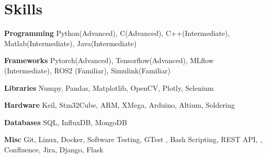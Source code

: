 
\section{Skills}
  \vspace{2pt}
  \resumeSubHeadingListStart
    \small{\item{

    \textbf{\color{MidnightBlue}Programming}{ Python(Advanced), C(Advanced), C++(Intermediate), Matlab(Intermediate), Java(Intermediate)} \\ \vspace{3pt}

    \textbf{\color{MidnightBlue}Frameworks}{ Pytorch(Advanced), Tensorflow(Advanced), MLflow (Intermediate)}, ROS2 (Familiar), Simulink(Familiar)\\ \vspace{3pt}

    \textbf{\color{MidnightBlue}Libraries}{ Numpy, Pandas, Matplotlib, OpenCV, Plotly, Selenium} \\ \vspace{3pt}

    \textbf{\color{MidnightBlue}Hardware}{ Keil, Stm32Cube, ARM, XMega, Arduino, Altium, Soldering} \\ \vspace{3pt}

    \textbf{\color{MidnightBlue}Databases}{ SQL, InfluxDB, MongoDB} \\ \vspace{3pt}

    \textbf{\color{MidnightBlue}Misc}{ Git, Linux, Docker, Software Testing, GTest , Bash Scripting, REST API, , Confluence, Jira, Django, Flask} \\ \vspace{3pt}
            
    }}
  \resumeSubHeadingListEnd
